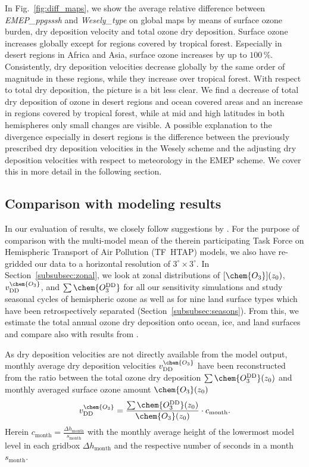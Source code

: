 \documentclass[gmd, manuscript]{copernicus}
\begin{document}
In Fig.~\ref{fig:diff_maps}, we show the average relative difference between \emph{EMEP\_ppgsssh} and \emph{Wesely\_type} on global maps by means of surface ozone burden, dry deposition velocity and total ozone dry deposition. Surface ozone increases globally except for regions covered by tropical forest. Especially in desert regions in Africa and Asia, surface ozone increases by up to $100\,\unit{\%}$. Consistently, dry deposition velocities decrease globally by the same order of magnitude in these regions, while they increase over tropical forest. With respect to total dry deposition, the picture is a bit less clear. We find a decrease of total dry deposition of ozone in desert regions and ocean covered areas and an increase in regions covered by tropical forest, while at mid and high latitudes in both hemispheres only small changes are visible. A possible explanation to the divergence especially in desert regions is the difference between the previously prescribed dry deposition velocities in the Wesely scheme and the adjusting dry deposition velocities with respect to meteorology in the EMEP scheme. We cover this in more detail in the following section.

\subsection{Comparison with modeling results}
\label{subsec:model}
%
In our evaluation of results, we closely follow suggestions by \citet{ACP:Hardacre2015}. For the purpose of comparison with the multi-model mean of the therein participating Task Force on Hemispheric Transport of Air Pollution (TF~HTAP) models, we also have re-gridded our data to a horizontal resolution of $3^\circ\times 3^\circ$. In Section~\ref{subsubsec:zonal}, we look at zonal distributions of $[\chem{O_3}](z_0)$, $v^\chem{O_3}_\text{DD}$, and $\sum\chem{O_3^\text{DD}}$ for all our sensitivity simulations and study seasonal cycles of hemispheric ozone as well as for nine land surface types which have been retrospectively separated (Section~\ref{subsubsec:seasons}). From this, we estimate the total annual ozone dry deposition onto ocean, ice, and land surfaces and compare also with results from \citet{ACP:Luhar2017}.

As dry deposition velocities are not directly available from the model output, monthly average dry deposition velocities $v^\chem{O_3}_\text{DD}$ have been reconstructed from the ratio between the total ozone dry deposition $\sum \chem{O_3^\text{DD}}(z_0)$ and monthly averaged surface ozone amount $\chem{O_3}(z_0)$ 
\begin{equation}
  v^\chem{O_3}_\text{DD} = \frac{\sum \chem{O_3^\text{DD}}(z_0)}{\chem{O_3}(z_0)}\cdot c_\text{month}.
\end{equation}
Herein $c_\text{month} = \frac{\Delta h_\text{month}}{s_\text{month}}$ with the monthly average height of the lowermost model level in each gridbox $\Delta h_\text{month}$ and the respective number of seconds in a month $s_\text{month}$.
%
\end{document}
